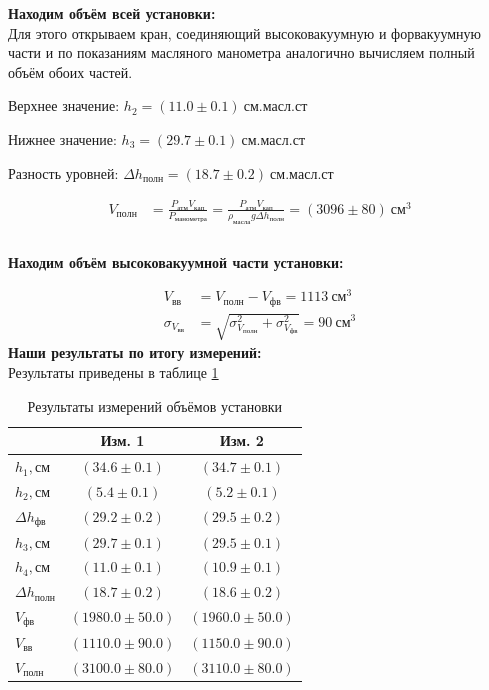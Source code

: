 \documentclass[a4paper, 12pt]{article}
\begin{document}
        \textbf{Находим объём всей установки:} \\

            Для этого открываем кран, соединяющий высоковакуумную и форвакуумную части и по показаниям масляного манометра аналогично вычисляем полный объём обоих частей.

            Верхнее значение: $h_2 = (11.0 \pm 0.1)~см.масл.ст$

            Нижнее значение:  $h_3 = (29.7 \pm 0.1)~см.масл.ст$

            Разность уровней: $\Delta h_{полн} = (18.7 \pm 0.2)~см.масл.ст$

            \begin{align*}
                V_{полн} &= \frac{P_{атм} V_{кап}}{P_{манометра}} = \frac{P_{атм} V_{кап}}{\rho_{масла} g \Delta h_{полн}} = (3096 \pm 80)~см^3\\\\
            \end{align*}

        \textbf{Находим объём высоковакуумной части установки:}

            \begin{align}
                V_{вв} &= V_{полн} - V_{фв} = 1113~см^3\\
                \sigma_{V_{вв}} &= \sqrt{ \sigma_{V_{полн}}^2 + \sigma_{V_{фв}}^2 } = 90~см^3
            \end{align}
        \textbf{Наши результаты по итогу измерений:} \\
        Результаты приведены в таблице \ref{volumes}

        \begin{table}[!ht]
            \centering
            \begin{tabular}{|l|c|c|}
                \hline

                 & Изм. 1 & Изм. 2\\ \hline
                $h_1, см$ & $(34.6 \pm 0.1)$ & $(34.7 \pm 0.1)$\\ \hline
                $h_2, см$ & $(5.4 \pm 0.1)$ & $(5.2 \pm 0.1)$\\ \hline
                $\Delta h_{фв}$ & $(29.2 \pm 0.2)$ & $(29.5 \pm 0.2)$\\ \hline
                $h_3, см$ & $(29.7 \pm 0.1)$ & $(29.5 \pm 0.1)$\\ \hline
                $h_4, см$ & $(11.0 \pm 0.1)$ & $(10.9 \pm 0.1)$\\ \hline
                $\Delta h_{полн}$ & $(18.7 \pm 0.2)$ & $(18.6 \pm 0.2)$\\ \hline
                $V_{фв}$ & $(1980.0 \pm 50.0)$ & $(1960.0 \pm 50.0)$\\ \hline
                $V_{вв}$ & $(1110.0 \pm 90.0)$ & $(1150.0 \pm 90.0)$\\ \hline
                $V_{полн}$ & $(3100.0 \pm 80.0)$ & $(3110.0 \pm 80.0)$\\ \hline

            \end{tabular}
            \caption{Результаты измерений объёмов установки}
            \label{volumes}
        \end{table}
\end{document}
